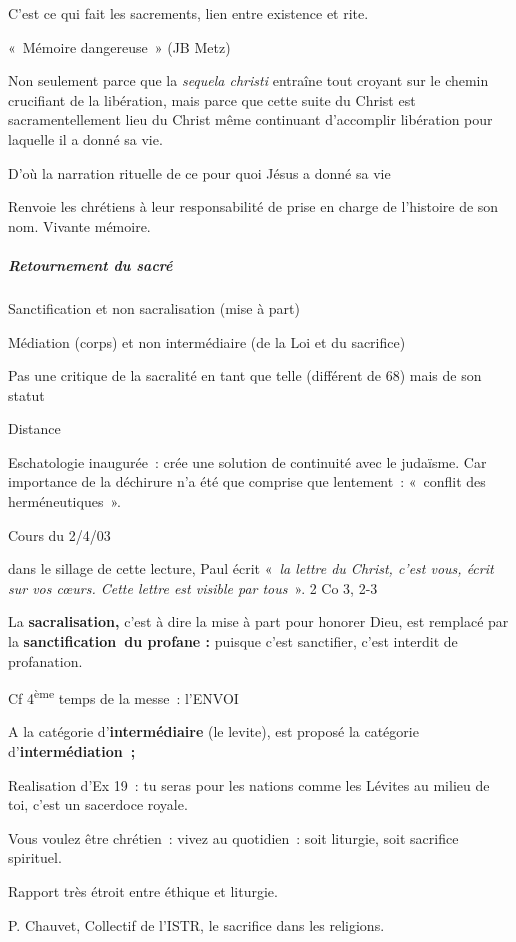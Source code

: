 C'est ce qui fait les sacrements, lien entre existence et rite.

«~Mémoire dangereuse~» (JB Metz)

Non seulement parce que la \emph{sequela christi} entraîne tout croyant
sur le chemin crucifiant de la libération, mais parce que cette suite du
Christ est sacramentellement lieu du Christ même continuant d'accomplir
libération pour laquelle il a donné sa vie.

D'où la narration rituelle de ce pour quoi Jésus a donné sa vie

Renvoie les chrétiens à leur responsabilité de prise en charge de
l'histoire de son nom. Vivante mémoire.

\hypertarget{retournement-du-sacruxe9}{%
\subparagraph{Retournement du sacré}\label{retournement-du-sacruxe9}}

Sanctification et non sacralisation (mise à part)

Médiation (corps) et non intermédiaire (de la Loi et du sacrifice)

Pas une critique de la sacralité en tant que telle (différent de 68)
mais de son statut

Distance

Eschatologie inaugurée~: crée une solution de continuité avec le
judaïsme. Car importance de la déchirure n'a été que comprise que
lentement~: «~conflit des herméneutiques~».

Cours du 2/4/03

dans le sillage de cette lecture, Paul écrit «~\emph{la lettre du
Christ, c'est vous, écrit sur vos cœurs. Cette lettre est visible par
tous}~». 2 Co 3, 2-3

La \textbf{sacralisation,} c'est à dire la mise à part pour honorer
Dieu, est remplacé par la \textbf{sanctification~du profane :} puisque
c'est sanctifier, c'est interdit de profanation.

Cf 4\textsuperscript{ème} temps de la messe~: l'ENVOI

A la catégorie d'\textbf{intermédiaire} (le levite), est proposé la
catégorie d'\textbf{intermédiation~;}

Realisation d'Ex 19~: tu seras pour les nations comme les Lévites au
milieu de toi, c'est un sacerdoce royale.

Vous voulez être chrétien~: vivez au quotidien~: soit liturgie, soit
sacrifice spirituel.

Rapport très étroit entre éthique et liturgie.

P. Chauvet, Collectif de l'ISTR, le sacrifice dans les religions.


